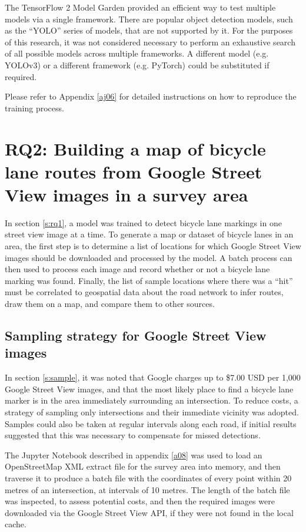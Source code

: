 \documentclass[11pt,twoside]{report}
\begin{document}
The TensorFlow 2 Model Garden provided an efficient way to test multiple models via a single framework.  There are popular object detection models, such as the ``YOLO'' series of models, that are not supported by it.  For the purposes of this research, it was not considered necessary to perform an exhaustive search of all possible models across multiple frameworks.  A different model (e.g. YOLOv3) or a different framework (e.g. PyTorch) could be substituted if required.

Please refer to Appendix \ref{aj06} for detailed instructions on how to reproduce the training process.

\section{RQ2: Building a map of bicycle lane routes from Google Street View images in a survey area}
\label{s:rq2}

In section \ref{s:rq1}, a model was trained to detect bicycle lane markings in one street view image at a time.  To generate a map or dataset of bicycle lanes in an area, the first step is to determine a list of locations for which Google Street View images should be downloaded and processed by the model.  A batch process can then used to process each image and record whether or not a bicycle lane marking was found.  Finally, the list of sample locations where there was a ``hit'' must be correlated to geospatial data about the road network to infer routes, draw them on a map, and compare them to other sources.


\subsection{Sampling strategy for Google Street View images}
\label{s:rq2a}

In section \ref{s:sample}, it was noted that Google charges up to \$7.00 USD per 1,000 Google Street View images, and that the most likely place to find a bicycle lane marker is in the area immediately surrounding an intersection.  To reduce costs, a strategy of sampling only intersections and their immediate vicinity was adopted.  Samples could also be taken at regular intervals along each road, if initial results suggested that this was necessary to compensate for missed detections.

The Jupyter Notebook described in appendix \ref{a08} was used to load an OpenStreetMap XML extract file for the survey area into memory, and then traverse it to produce a batch file with the coordinates of every point within 20 metres of an intersection, at intervals of 10 metres.  The length of the batch file was inspected, to assess potential costs, and then the required images were downloaded via the Google Street View API, if they were not found in the local cache.
\end{document}
